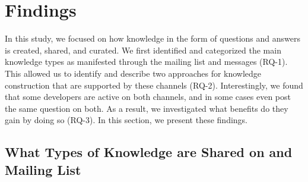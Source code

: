 \section{Findings}
\label{cha:findings}
In this study, we focused on how knowledge in the form of questions and answers is created, shared, and curated. We first identified and categorized the main knowledge types as manifested through the \RH mailing list and \SO messages (RQ-1). This allowed us to identify and describe two approaches for knowledge construction that are supported by these channels (RQ-2). Interestingly, we found that some developers are active on both channels, and in some cases even post the same question on both. As a result, we investigated what benefits do they gain by doing so (RQ-3). In this section, we present these findings.

\subsection{What Types of Knowledge are Shared on \SO and \RH Mailing List}
\label{cha:findings-types}

